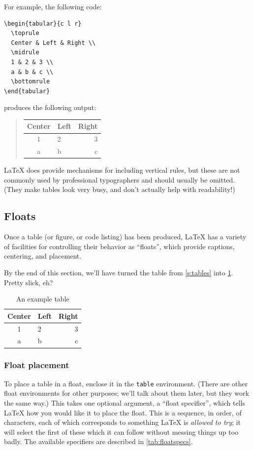 \documentclass{article}
\newcommand*{\code}[1]{\texttt{#1}}
\begin{document}
For example, the following code:
\begin{verbatim}
\begin{tabular}{c l r}
  \toprule
  Center & Left & Right \\
  \midrule
  1 & 2 & 3 \\
  a & b & c \\
  \bottomrule
\end{tabular}
\end{verbatim}
produces the following output:
\begin{quote}
  \begin{tabular}{c l r}
    \toprule
    Center & Left & Right \\
    \midrule
    1 & 2 & 3 \\
    a & b & c \\
    \bottomrule
  \end{tabular}
\end{quote}

\LaTeX{} does provide mechanisms for including vertical rules, but these are not commonly used by professional typographers and should usually be omitted.
(They make tables look very busy, and don't actually help with readability!)

\subsection{Floats}
\label{s:floats}
Once a table (or figure, or code listing) has been produced, \LaTeX{} has a variety of facilities for controlling their behavior as \enquote{floats}, which provide captions, centering, and placement.

By the end of this section, we'll have turned the table from \cref{s:tables} into \cref{tab:example}.
Pretty slick, eh?

\begin{table}[htb]
  \centering{}
    \begin{tabular}{c l r}
    \toprule
    Center & Left & Right \\
    \midrule
    1 & 2 & 3 \\
    a & b & c \\
    \bottomrule
  \end{tabular}
  \caption{An example table}
  \label{tab:example}
\end{table}

\subsubsection{Float placement}
\label{s:floatplacement}
To place a table in a float, enclose it in the \code{table} environment.
(There are other float environments for other purposes; we'll talk about them later, but they work the same way.)
This takes one optional argument, a \enquote{float specifier}, which tells \LaTeX{} how you would like it to place the float.
This is a sequence, in order, of characters, each of which corresponds to something \LaTeX{} is \emph{allowed to try}; it will select the first of these which it can follow without messing things up too badly.
The available specifiers are described in \cref{tab:floatspecs}.
\end{document}
